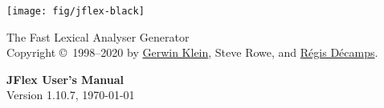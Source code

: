 \documentclass[11pt]{scrartcl}
\begin{document}
\centerline{\texttt{[image: fig/jflex-black]}}

\begin{center}
\sffamily
{\Large The Fast Lexical Analyser Generator}\\
\smallskip\smallskip
Copyright \copyright\ 1998--2020 by \href{http://www.doclsf.de}{Gerwin Klein},
Steve Rowe, and \href{http://regis.decamps.info/}{R\'egis D\'ecamps}.

\vspace*{15ex}
{\Huge \sffamily \bfseries JFlex User's Manual}\\
\bigskip
Version 1.10.7, {\today}
\end{center}

\newpage
\tableofcontents
\newpage













\newpage



\end{document}

